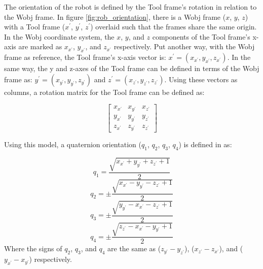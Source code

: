 \documentclass{cslthse-msc}
\begin{document}
The orientation of the robot is defined by the Tool frame's rotation in relation to the Wobj frame. In figure \ref{fig:rob_orientation}, there is a Wobj frame ($x$, $y$, $z$) with a Tool frame ($x^\prime$, $y^\prime$, $z^\prime$) overlaid such that the frames share the same origin. In the Wobj coordinate system, the $x$, $y$, and $z$ components of the Tool frame's x-axis are marked as $x_{x^\prime}$, $y_{x^\prime}$, and $z_{x^\prime}$ respectively. Put another way, with the Wobj frame as reference, the Tool frame's x-axis vector is: $x^\prime = (x_{x^\prime}, y_{x^\prime}, z_{x^\prime})$. In the same way, the y and z-axes of the Tool frame can be defined in terms of the Wobj frame as: $y^\prime = (x_{y^\prime}, y_{y^\prime}, z_{y^\prime})$ and $z^\prime = (x_{z^\prime}, y_{z^\prime}, z_{z^\prime})$. Using these vectors as columns, a rotation matrix for the Tool frame can be defined as: 

$$
\begin{bmatrix}
x_{x^\prime} & x_{y^\prime} & x_{z^\prime}\\
y_{x^\prime} & y_{y^\prime} & y_{z^\prime}\\
z_{x^\prime} & z_{y^\prime} & z_{z^\prime}
\end{bmatrix}
$$


Using this model, a quaternion orientation ($q_1$, $q_2$, $q_3$, $q_4$) is defined in \cite[Sec. 3.53]{ABB:rapid_instructions} as: 

$$q_1 = \frac{\sqrt{x_{x^\prime} + y_{y^\prime} + z_{z^\prime} + 1}}{2}$$
$$q_2 = \pm \frac{\sqrt{x_{x^\prime} - y_{y^\prime} - z_{z^\prime} + 1}}{2}$$
$$q_3 = \pm \frac{\sqrt{y_{y^\prime} - x_{x^\prime} - z_{z^\prime} + 1}}{2}$$
$$q_4 = \pm \frac{\sqrt{z_{z^\prime} - x_{x^\prime} - y_{y^\prime} + 1}}{2}$$
Where the signs of $q_2$, $q_3$, and $q_4$ are the same as ($z_{y^\prime} - y_{z^\prime}$), ($x_{z^\prime} - z_{x^\prime}$), and ($y_{x^\prime} - x_{y^\prime}$) respectively. 
\end{document}
